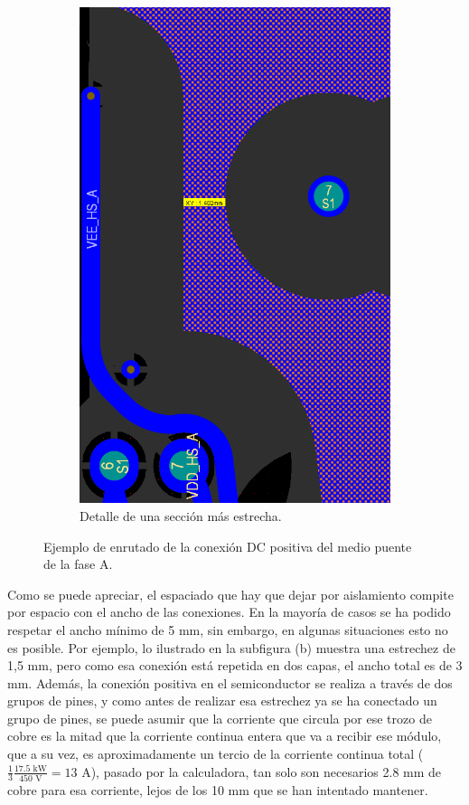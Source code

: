 \begin{figure}[H]
\begin{subfigure}{0.4\linewidth}
		\includegraphics[width=\linewidth]{fig/layout2}
		\caption{Detalle de una sección más estrecha.}
	\end{subfigure}
	\caption{Ejemplo de enrutado de la conexión DC positiva del medio puente de la fase A.}
\end{figure}

Como se puede apreciar, el espaciado que hay que dejar por aislamiento compite por espacio con el ancho de las conexiones. En la mayoría de casos se ha podido respetar el ancho mínimo de 5 mm, sin embargo, en algunas situaciones esto no es posible. Por ejemplo, lo ilustrado en la subfigura (b) muestra una estrechez de 1,5 mm, pero como esa conexión está repetida en dos capas, el ancho total es de 3 mm. Además, la conexión positiva en el semiconductor se realiza a través de dos grupos de pines, y como antes de realizar esa estrechez ya se ha conectado un grupo de pines, se puede asumir que la corriente que circula por ese trozo de cobre es la mitad que la corriente continua entera que va a recibir ese módulo, que a su vez, es aproximadamente un tercio de la corriente continua total ($\frac{1}{3}\frac{17.5 \text{ kW}}{450 \text{ V}} = 13 \text{ A}$), pasado por la calculadora, tan solo son necesarios 2.8 mm de cobre para esa corriente, lejos de los 10 mm que se han intentado mantener.

